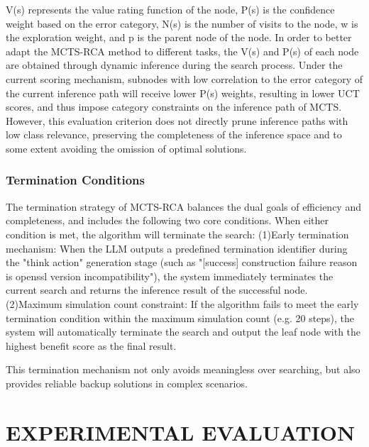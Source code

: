 \documentclass[10pt,conference]{IEEEtran}
\begin{document}
V(s) represents the value rating function of the node, P(s) is the confidence weight based on the error category, N(s) is the number of visits to the node, w is the exploration weight, and p is the parent node of the node. In order to better adapt the MCTS-RCA method to different tasks, the V(s) and P(s) of each node are obtained through dynamic inference during the search process. Under the current scoring mechanism, subnodes with low correlation to the error category of the current inference path will receive lower P(s) weights, resulting in lower UCT scores, and thus impose category constraints on the inference path of MCTS. However, this evaluation criterion does not directly prune inference paths with low class relevance, preserving the completeness of the inference space and to some extent avoiding the omission of optimal solutions.

\subsubsection{Termination Conditions}\label{ss:mcts-term}
The termination strategy of MCTS-RCA balances the dual goals of efficiency and completeness, and includes the following two core conditions. When either condition is met, the algorithm will terminate the search: (1)Early termination mechanism: When the LLM outputs a predefined termination identifier during the "think action" generation stage (such as "[success] construction failure reason is openssl version incompatibility"), the system immediately terminates the current search and returns the inference result of the successful node. (2)Maximum simulation count constraint: If the algorithm fails to meet the early termination condition within the maximum simulation count (e.g. 20 steps), the system will automatically terminate the search and output the leaf node with the highest benefit score as the final result. 

This termination mechanism not only avoids meaningless over searching, but also provides reliable backup solutions in complex scenarios.

\section{EXPERIMENTAL EVALUATION}
\end{document}
